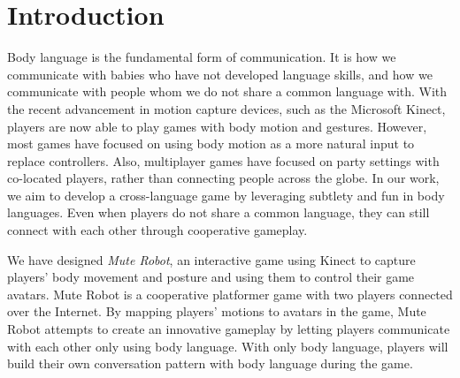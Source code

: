 \documentclass{chi-ext}
\def\plaingeneralterms{Documentation, Standardization}
\begin{document}

\section{Introduction}

Body language is the fundamental form of communication. It is how we communicate with babies who have not developed language skills, and how we communicate with people whom we do not share a common language with.
With the recent advancement in motion capture devices, such as the Microsoft Kinect\cite{Kinect}, players are now able to play games with body motion and gestures.
However, most games have focused on using body motion as a more natural input to replace controllers.
Also, multiplayer games have focused on party settings with co-located players, rather than connecting people across the globe.
In our work, we aim to develop a cross-language game by leveraging subtlety and fun in body languages. Even when players do not share a common language, they can still connect with each other through cooperative gameplay.

We have designed {\it Mute Robot}, an interactive game using Kinect to capture players' body movement and posture and using them to control their game avatars. 
Mute Robot is a cooperative platformer game with two players connected over the Internet.
By mapping players' motions to avatars in the game, Mute Robot attempts to create an innovative gameplay by letting players communicate with each other only using body language.
With only body language, players will build their own conversation pattern with body language during the game. 
\end{document}

